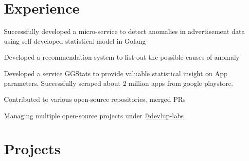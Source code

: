 \documentclass[]{deedy-resume-openfont}
\begin{document}
\begin{minipage}[t]{0.66\textwidth} 


\section{Experience}
\vspace{\topsep} %
\begin{tightemize}
\item Successfully developed a micro-service to detect anomalies in advertisement data using self developed statistical model in Golang
\item Developed a recommendation system to list-out the possible causes of anomaly
\item Developed a service GGStats to provide valuable statistical insight on App parameters. Successfully scraped about 2 million apps from google playstore.
\end{tightemize}


\begin{tightemize}
\item Contributed to various open-source repositories, merged PRs
\item Managing multiple open-source projects under \href{https://github.com/orgs/devlup-labs/teams?query=\%40harsh-not-haarsh}{@devlup-labs \faExternalLink}
\end{tightemize}



\section{Projects}


\end{minipage}
\end{document}
